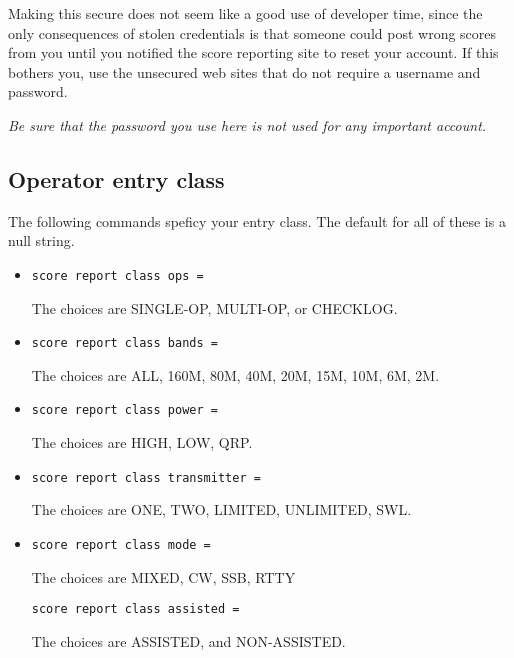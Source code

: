 \documentclass[12pt]{article}
\begin{document}
\begin{itemize}
Making this secure does not seem like a good use of developer time, since the
only consequences of stolen credentials is that someone could post wrong
scores from you until you notified the score reporting
site to reset your account. If this bothers you, use the unsecured web sites
that do not require a username and password.

{\em Be sure that the password you use here
is not used for any important account.}
\end{itemize}

\subsection{Operator entry class}
The following commands speficy your entry class. The default for all of
these is a null string.
\begin{itemize}
\item
\begin{verbatim}
score report class ops =
\end{verbatim}
The choices are SINGLE-OP, MULTI-OP, or CHECKLOG.

\item
\begin{verbatim}
score report class bands =
\end{verbatim}
The choices are ALL, 160M, 80M, 40M, 20M, 15M, 10M, 6M, 2M.

\item
\begin{verbatim}
score report class power =
\end{verbatim}
The choices are HIGH, LOW, QRP.

\item
\begin{verbatim}
score report class transmitter =
\end{verbatim}
The choices are ONE, TWO, LIMITED, UNLIMITED, SWL.

\item
\begin{verbatim}
score report class mode =
\end{verbatim}
The choices are MIXED, CW, SSB, RTTY

\begin{verbatim}
score report class assisted =
\end{verbatim}
The choices are ASSISTED, and NON-ASSISTED.
\end{itemize}
\end{document}
